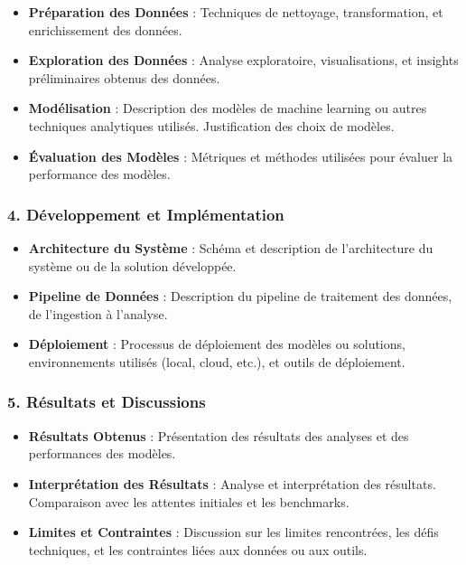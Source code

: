 \documentclass[
  letterpaper,
  DIV=11,
  numbers=noendperiod]{scrartcl}
\providecommand{\tightlist}{%
  \setlength{\itemsep}{0pt}\setlength{\parskip}{0pt}}\usepackage{longtable,booktabs,array}
\begin{document}
\begin{itemize}
\tightlist
\item
  \textbf{Préparation des Données} : Techniques de nettoyage,
  transformation, et enrichissement des données.
\item
  \textbf{Exploration des Données} : Analyse exploratoire,
  visualisations, et insights préliminaires obtenus des données.
\item
  \textbf{Modélisation} : Description des modèles de machine learning ou
  autres techniques analytiques utilisés. Justification des choix de
  modèles.
\item
  \textbf{Évaluation des Modèles} : Métriques et méthodes utilisées pour
  évaluer la performance des modèles.
\end{itemize}

\subsubsection{4. Développement et
Implémentation}\label{duxe9veloppement-et-impluxe9mentation}

\begin{itemize}
\tightlist
\item
  \textbf{Architecture du Système} : Schéma et description de
  l'architecture du système ou de la solution développée.
\item
  \textbf{Pipeline de Données} : Description du pipeline de traitement
  des données, de l'ingestion à l'analyse.
\item
  \textbf{Déploiement} : Processus de déploiement des modèles ou
  solutions, environnements utilisés (local, cloud, etc.), et outils de
  déploiement.
\end{itemize}

\subsubsection{5. Résultats et
Discussions}\label{ruxe9sultats-et-discussions}

\begin{itemize}
\tightlist
\item
  \textbf{Résultats Obtenus} : Présentation des résultats des analyses
  et des performances des modèles.
\item
  \textbf{Interprétation des Résultats} : Analyse et interprétation des
  résultats. Comparaison avec les attentes initiales et les benchmarks.
\item
  \textbf{Limites et Contraintes} : Discussion sur les limites
  rencontrées, les défis techniques, et les contraintes liées aux
  données ou aux outils.
\end{itemize}
\end{document}
